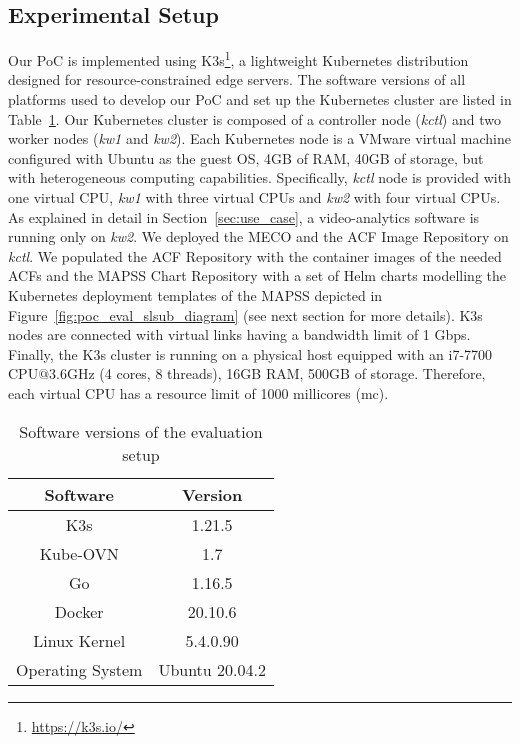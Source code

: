 \subsection{Experimental Setup}
\label{sec:exp_setup}
\noindent
%
Our PoC is implemented using K3s\footnote{\url{https://k3s.io/}}, a lightweight Kubernetes distribution designed for resource-constrained edge servers. The software versions of all platforms used to develop our PoC and set up the Kubernetes cluster are listed in Table~\ref{tab:sw_version}. Our Kubernetes cluster is composed of a controller node (\textit{kctl}) and two worker nodes (\textit{kw1} and \textit{kw2}). Each Kubernetes node is a VMware virtual machine configured with Ubuntu as the guest OS, 4GB of RAM, 40GB of storage, but with heterogeneous computing capabilities. Specifically, \textit{kctl} node is provided with one virtual CPU, \textit{kw1} with three virtual CPUs and \textit{kw2} with four virtual CPUs. As explained in detail in Section~\ref{sec:use_case}, a video-analytics software is running only on \textit{kw2}. We deployed the MECO and the ACF Image Repository on \textit{kctl}. We populated the ACF Repository with the container images of the needed ACFs and the MAPSS Chart Repository with a set of Helm charts modelling the Kubernetes deployment templates of the MAPSS depicted in Figure~\ref{fig:poc_eval_slsub_diagram} (see next section for more details). K3s nodes are connected with virtual links having a bandwidth limit of 1 Gbps. Finally, the K3s cluster is running on a physical host equipped with an i7-7700 CPU$@$3.6GHz (4 cores, 8 threads), 16GB RAM, 500GB of storage. Therefore, each virtual CPU has a resource limit of 1000 millicores (mc). 
%
\begin{table}[t]
    \centering
    \small
    \begin{tabular}{|c|c|}
    \hline
        \textbf{Software} & \textbf{Version} \\
        \hline
         K3s & 1.21.5 \\ 
         Kube-OVN & 1.7 \\ 
         Go & 1.16.5 \\
         Docker & 20.10.6 \\
         Linux Kernel & 5.4.0.90 \\
         Operating System & Ubuntu 20.04.2 \\
         \hline
    \end{tabular}
    \caption{Software versions of the evaluation setup}
    \label{tab:sw_version}
    \vspace{-0.2cm}
\end{table}
%
%
